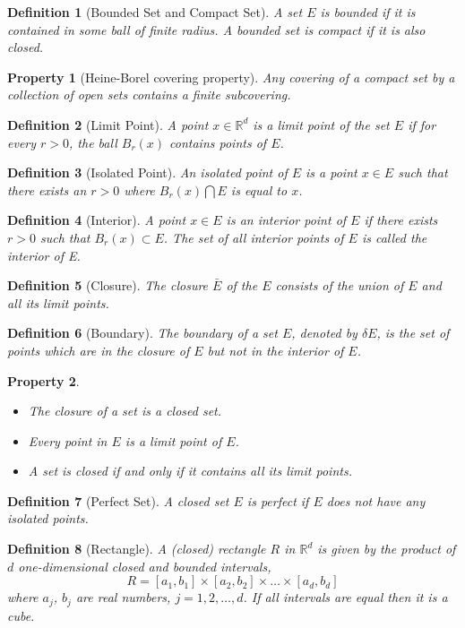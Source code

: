 \documentclass{report}
\theoremstyle{upthm}
\newtheorem{defn}{Definition}
\newtheorem{property}{Property}
\newcommand{\reals}{\mathbb{R}}
\newcommand{\intersection}{\bigcap}
\begin{document}
\begin{defn}[Bounded Set and Compact Set]
	A set $E$ is bounded if it is contained in some ball of finite radius.	A bounded set is compact if it is also closed.
\end{defn}
\begin{property}[Heine-Borel covering property]
	Any covering of a compact set by a collection of open sets contains a finite subcovering.
\end{property}
\begin{defn}[Limit Point]
	A point $x \in \reals^d$ is a limit point of the set $E$ if for every $r > 0$, the ball
	$B_r(x)$ contains points of $E$.
\end{defn}
\begin{defn}[Isolated Point]
	An isolated point of $E$ is a point $x \in E$ such that there exists an $r > 0$ where $B_r(x) \intersection E$ is equal to $x$.
\end{defn}
\begin{defn}[Interior]
	A point $x \in E$ is an interior point of $E$ if there exists $r > 0$ such that $B_r(x) \subset E$. The set of all interior points of $E$ is called the interior of E.
\end{defn}
\begin{defn}[Closure]
	The closure $\bar{E}$ of the $E$ consists of the union of $E$ and all
	its limit points.
\end{defn}
\begin{defn}[Boundary]
	The boundary of a set $E$, denoted by $\delta E$, is the set of	points which are in the closure of $E$ but not in the interior of $E$.
\end{defn}
\begin{property}\item
	\begin{itemize}
		\item The closure of a set is a closed set.
		\item Every point in $E$ is a limit point of $E$.
		\item A set is closed if and only if it contains all its limit points.
	\end{itemize}
\end{property}
\begin{defn}[Perfect Set]
	A closed set $E$ is perfect if $E$ does not have any isolated points.
\end{defn}

\begin{defn}[Rectangle]
	A (closed) rectangle $R$ in $\reals^d$ is given by the product of $d$ one-dimensional
	closed and bounded intervals,
	$$R = [a_1, b_1] \times [a_2, b_2] \times \dots \times [a_d, b_d]$$
	where $a_j$, $b_j$ are real numbers, $j = 1, 2, \dots, d$. If all intervals are equal then it is a cube.
\end{defn}
\end{document}
